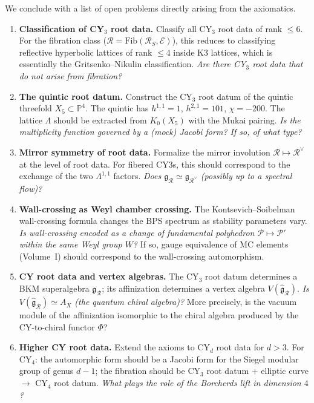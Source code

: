 We conclude with a list of open problems directly arising from the axiomatics.

\begin{enumerate}[label=\textbf{P\arabic*.}]
 \item \textbf{Classification of CY$_3$ root data.} Classify all CY$_3$ root data of rank $\leq 6$. For the fibration class ($\mathcal{R} = \mathrm{Fib}(\mathcal{R}_S, \mathcal{E})$), this reduces to classifying reflective hyperbolic lattices of rank $\leq 4$ inside K3 lattices, which is essentially the Gritsenko--Nikulin classification. \emph{Are there CY$_3$ root data that do not arise from fibration?}

 \item \textbf{The quintic root datum.} Construct the CY$_3$ root datum of the quintic threefold $X_5 \subset \mathbb{P}^4$. The quintic has $h^{1,1} = 1$, $h^{2,1} = 101$, $\chi = -200$. The lattice $\Lambda$ should be extracted from $K_0(X_5)$ with the Mukai pairing. \emph{Is the multiplicity function governed by a (mock) Jacobi form? If so, of what type?}

 \item \textbf{Mirror symmetry of root data.} Formalize the mirror involution $\mathcal{R} \mapsto \mathcal{R}^\vee$ at the level of root data. For fibered CY3s, this should correspond to the exchange of the two $\Lambda^{1,1}$ factors. \emph{Does $\mathfrak{g}_\mathcal{R} \simeq \mathfrak{g}_{\mathcal{R}^\vee}$ (possibly up to a spectral flow)?}

 \item \textbf{Wall-crossing as Weyl chamber crossing.} The Kontsevich--Soibelman wall-crossing formula changes the BPS spectrum as stability parameters vary. \emph{Is wall-crossing encoded as a change of fundamental polyhedron $\mathcal{P} \mapsto \mathcal{P}'$ within the same Weyl group $W$?} If so, gauge equivalence of MC elements (Volume~I) should correspond to the wall-crossing automorphism.

 \item \textbf{CY root data and vertex algebras.} The CY$_3$ root datum determines a BKM superalgebra $\mathfrak{g}_\mathcal{R}$; its affinization determines a vertex algebra $V(\widehat{\mathfrak{g}}_\mathcal{R})$. \emph{Is $V(\widehat{\mathfrak{g}}_\mathcal{R}) \simeq A_X$ (the quantum chiral algebra)?} More precisely, is the vacuum module of the affinization isomorphic to the chiral algebra produced by the CY-to-chiral functor $\Phi$?

 \item \textbf{Higher CY root data.} Extend the axioms to CY$_d$ root data for $d > 3$. For CY$_4$: the automorphic form should be a Jacobi form for the Siegel modular group of genus $d - 1$; the fibration should be CY$_3$ root datum $+$ elliptic curve $\to$ CY$_4$ root datum. \emph{What plays the role of the Borcherds lift in dimension $4$?}
\end{enumerate}

